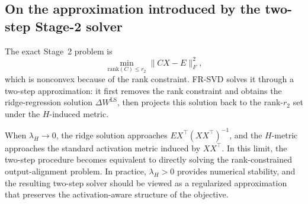 \documentclass[a4paper,fleqn]{cas-dc}
\begin{document}
\subsection{On the approximation introduced by the two-step Stage-2 solver}

The exact Stage~2 problem is
\begin{equation}
\min_{\mathrm{rank}(C)\le r_2} \|CX-E\|_F^2,
\end{equation}
which is nonconvex because of the rank constraint. FR-SVD solves it through a two-step approximation: it first removes the rank constraint and obtains the ridge-regression solution $\Delta W^{\mathrm{LS}}$, then projects this solution back to the rank-$r_2$ set under the $H$-induced metric.

When $\lambda_H \to 0$, the ridge solution approaches $EX^{\top}(XX^{\top})^{-1}$, and the $H$-metric approaches the standard activation metric induced by $XX^{\top}$. In this limit, the two-step procedure becomes equivalent to directly solving the rank-constrained output-alignment problem. In practice, $\lambda_H > 0$ provides numerical stability, and the resulting two-step solver should be viewed as a regularized approximation that preserves the activation-aware structure of the objective.



\end{document}
